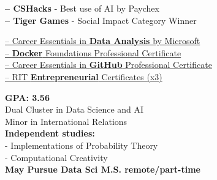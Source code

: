 \documentclass[10pt,a4paper,ragged2e,withhyper]{altacv}
\begin{document}
\begin{paracol}{2}

\textbf{ -- CSHacks} - Best use of AI by Paychex\\
\textbf{ -- Tiger Games} - Social Impact Category Winner\\

\divider

\href{https://www.linkedin.com/learning/certificates/2cb69378c606fec5a6f3a107b99a896862db392b7a3692f71a6b53af5d5545c5}{ -- Career Essentials in \textbf{Data Analysis} by Microsoft}\\
\href{https://www.linkedin.com/learning/certificates/7b952323152e258ca468c33ddc9ebcf3c55036f58a5cfb3fb9c1410da655aaa5}{ -- \textbf{Docker} Foundations Professional Certificate}\\
\href{https://www.linkedin.com/learning/certificates/7facc28a13405134b3b7fa785303e9b1cf697f32d67f759e89960fbdc8a044d9}{ -- Career Essentials in \textbf{GitHub} Professional Certificate}\\
\href{https://rit.edu/simonecenter}{ -- RIT \textbf{Entrepreneurial} Certificates (x3)}\\

\switchcolumn


\textbf{GPA: 3.56}\\
Dual Cluster in Data Science and AI\\
Minor in International Relations\\
\textbf{Independent studies:}\\
 - Implementations of Probability Theory\\
 - Computational Creativity\\
\medskip
\textbf{May Pursue Data Sci M.S. remote/part-time}



\medskip


\end{paracol}
\end{document}
